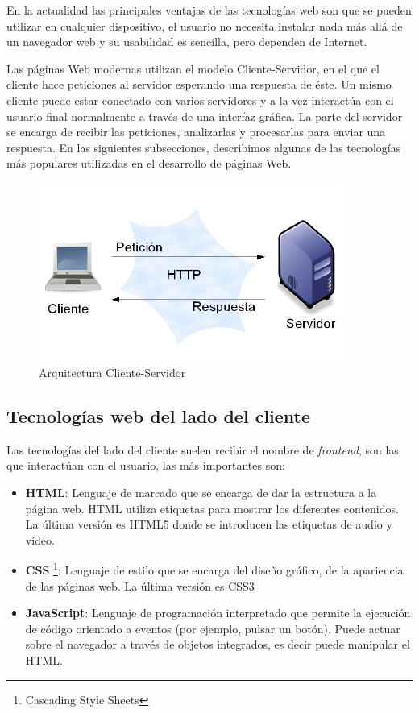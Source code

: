 En la actualidad las principales ventajas de las tecnologías web son que se pueden utilizar en cualquier dispositivo, el usuario no necesita instalar nada más allá de un navegador web y su usabilidad es sencilla, pero dependen de Internet\cite{juan}.

Las páginas Web modernas utilizan el modelo Cliente-Servidor, en el que el cliente hace peticiones al servidor esperando una respuesta de éste. Un mismo cliente puede estar conectado con varios servidores y a la vez interactúa con el usuario final normalmente a través de una interfaz gráfica. La parte del servidor se encarga de recibir las peticiones, analizarlas y procesarlas para enviar una respuesta. En las siguientes subsecciones, describimos algunas de las tecnologías más populares utilizadas en el desarrollo de páginas Web.

\begin{figure}[H]
    \centering
    \includegraphics[width=10cm, keepaspectratio]{img/arquitectura.png}
    \caption{Arquitectura Cliente-Servidor}
    \label{fig:arquitectura}
\end{figure}

\subsection{Tecnologías web del lado del cliente}
Las tecnologías del lado del cliente suelen recibir el nombre de \textit{frontend}, son las que interactúan con el usuario, las más importantes son:

\begin{itemize}
  \item \textbf{HTML}:  Lenguaje de marcado que se encarga de dar la estructura a la página web. HTML utiliza etiquetas para mostrar los diferentes contenidos. La última versión es HTML5 donde se introducen las etiquetas de audio y vídeo.
  \item \textbf{CSS} \footnote{Cascading Style Sheets}: Lenguaje de estilo que se encarga del diseño gráfico, de la apariencia de las páginas web. La última versión es CSS3
  \item \textbf{JavaScript}: Lenguaje de programación interpretado que permite la ejecución de código orientado a eventos (por ejemplo, pulsar un botón). Puede actuar sobre el navegador a través de objetos integrados, es decir puede manipular el HTML.
\end{itemize}
\newpage
